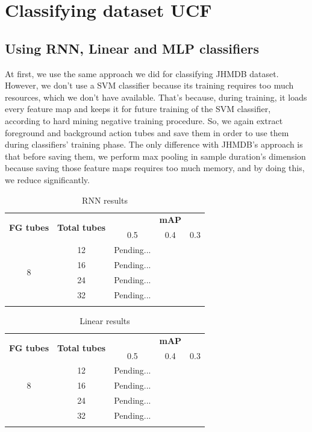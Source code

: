 \documentclass{report}
\begin{document}
\section{Classifying dataset UCF}


\subsection{Using RNN, Linear and MLP classifiers}

At first, we use the same approach we did for classifying JHMDB dataset. However, we don't use a SVM classifier because its training requires too much resources, which we don't have available. That's
because, during training, it loads every feature map and keeps it for future training of the SVM classifier, according to hard mining negative training procedure. So, we again extract foreground
and background action tubes and save them in order to use them during classifiers' training phase. The only difference with JHMDB's approach is that before saving them, we perform max pooling in
sample duration's dimension because saving those feature maps requires too much memory, and by doing this, we reduce significantly.
\begin{center}
  \begin{longtable}{|| c | c || c c c ||}
    \hline
    \multirow{2}{*}{\textbf{FG tubes}} & \multirow{2}{*}{\textbf{Total tubes}} & {} & \textbf{mAP} & {} \\
    {} & {} & 0.5 & 0.4 & 0.3 \\
    \hline
    \multirow{4}{*}{8} & 12 & Pending...\\
    \cline{2-5}
    {} & 16 & Pending... \\
    \cline{2-5}
    {} & 24 & Pending... \\
    \cline{2-5}
    {} & 32 & Pending... \\
    \hline

  \caption{RNN results}
  \label{table:ucf_rnn}
\end{longtable}
\end{center}
  
\begin{center}
  \begin{longtable}{|| c | c || c c c ||}
    \hline
    \multirow{2}{*}{\textbf{FG tubes}} & \multirow{2}{*}{\textbf{Total tubes}} & {} & \textbf{mAP} & {} \\
    {} & {} & 0.5 & 0.4 & 0.3 \\
    \hline
    \multirow{3}{*}{8} & 12 & Pending...\\
    \cline{2-5}
    {} & 16 & Pending... \\
    \cline{2-5}
    {} & 24 & Pending... \\
    \cline{2-5}
    {} & 32 & Pending... \\
    \hline

  \caption{Linear results}
  \label{table:ucf_linear}
\end{longtable}
\end{center}
\end{document}
